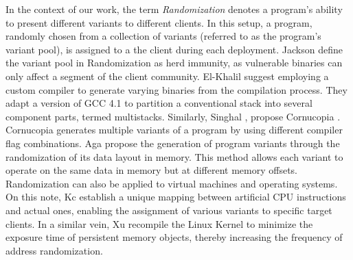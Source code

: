 \begin{strategy}[Randomization]
    \label{randomization}
    In the context of our work, the term \emph{Randomization} denotes a program's ability to present different variants to different clients. 
    In this setup, a program, randomly chosen from a collection of variants (referred to as the program's variant pool), is assigned to a the client during each deployment. 
    Jackson \etal \cite{jackson} define the variant pool in Randomization as herd immunity, as vulnerable binaries can only affect a segment of the client community. 
    El-Khalil \etal \cite{ElKhalil2004} suggest employing a custom compiler to generate varying binaries from the compilation process. 
    They adapt a version of GCC 4.1 to partition a conventional stack into several component parts, termed multistacks. 
    Similarly, Singhal \etal, propose Cornucopia \cite{cornucopia}.
    Cornucopia generates multiple variants of a program by using different compiler flag combinations.
    Aga \etal propose the generation of program variants through the randomization of its data layout in memory\cite{aga2019smokestack}. 
    This method allows each variant to operate on the same data in memory but at different memory offsets. 
    Randomization can also be applied to virtual machines and operating systems. On this note, Kc \etal \cite{Kc03} establish a unique mapping between artificial CPU instructions and actual ones, enabling the assignment of various variants to specific target clients. 
    In a similar vein, Xu \etal \cite{xu2020merr} recompile the Linux Kernel to minimize the exposure time of persistent memory objects, thereby increasing the frequency of address randomization.
\end{strategy}


